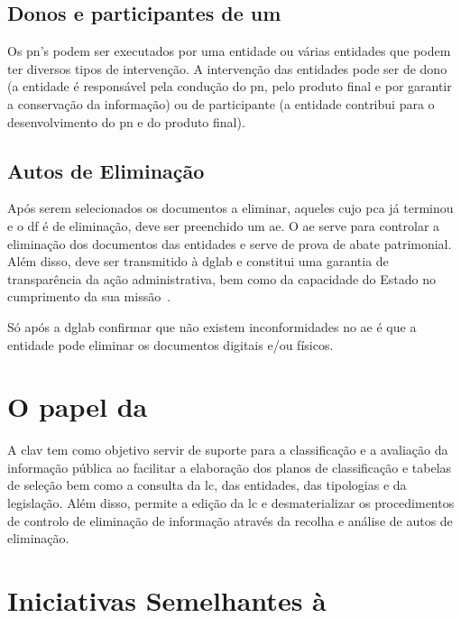 \subsection{Donos e participantes de um }

Os \acrshort{pn}'s podem ser executados por uma entidade ou várias entidades que podem ter diversos tipos de 
intervenção. A intervenção das entidades pode ser de dono (a entidade é responsável pela condução do \acrshort{pn}, 
pelo produto final e por garantir a conservação da informação) ou de participante (a entidade contribui para o 
desenvolvimento do \acrshort{pn} e do produto final).

\subsection{Autos de Eliminação}

Após serem selecionados os documentos a eliminar, aqueles cujo \acrshort{pca} já terminou e o \acrshort{df} é de 
eliminação, deve ser preenchido um \acrfull{ae}. O \acrshort{ae} serve para controlar a eliminação dos 
documentos das entidades e serve de prova de abate patrimonial. Além disso, deve ser transmitido à 
\acrshort{dglab} e constitui uma garantia de transparência da ação administrativa, bem como da capacidade do 
Estado no cumprimento da sua missão~\cite{pca}. 

Só após a \acrshort{dglab} confirmar que não existem 
inconformidades no \acrshort{ae} é que a entidade pode eliminar os documentos digitais e/ou físicos.

\section{O papel da }

A \acrshort{clav} tem como objetivo servir de suporte para a classificação e a avaliação da informação pública 
ao facilitar a elaboração dos planos de classificação e tabelas de seleção bem como a consulta da \acrshort{lc}, 
das entidades, das tipologias e da legislação. Além disso, permite a edição da \acrshort{lc} e desmaterializar 
os procedimentos de controlo de eliminação de informação através da recolha e análise de autos de eliminação.

\section{Iniciativas Semelhantes à }

